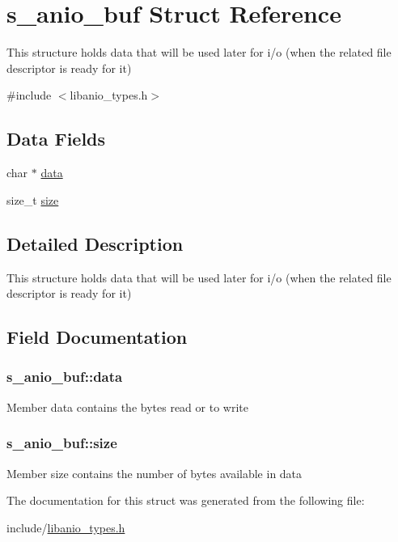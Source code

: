 \hypertarget{structs__anio__buf}{}\section{s\+\_\+anio\+\_\+buf Struct Reference}
\label{structs__anio__buf}


This structure holds data that will be used later for i/o (when the related file descriptor is ready for it)  




{\ttfamily \#include $<$libanio\+\_\+types.\+h$>$}

\subsection*{Data Fields}
\begin{DoxyCompactItemize}
\item 
char $\ast$ \hyperlink{structs__anio__buf_a130032371bea15404f3b665b30a7061b}{data}
\item 
size\+\_\+t \hyperlink{structs__anio__buf_aae7edea53529615402ceec1e26d755cf}{size}
\end{DoxyCompactItemize}


\subsection{Detailed Description}
This structure holds data that will be used later for i/o (when the related file descriptor is ready for it) 

\subsection{Field Documentation}
\hypertarget{structs__anio__buf_a130032371bea15404f3b665b30a7061b}{}
\subsubsection[{data}]{\setlength{\rightskip}{0pt plus 5cm}s\+\_\+anio\+\_\+buf\+::data}\label{structs__anio__buf_a130032371bea15404f3b665b30a7061b}
Member \textquotesingle{}data\textquotesingle{} contains the bytes read or to write \hypertarget{structs__anio__buf_aae7edea53529615402ceec1e26d755cf}{}
\subsubsection[{size}]{\setlength{\rightskip}{0pt plus 5cm}s\+\_\+anio\+\_\+buf\+::size}\label{structs__anio__buf_aae7edea53529615402ceec1e26d755cf}
Member \textquotesingle{}size\textquotesingle{} contains the number of bytes available in data 

The documentation for this struct was generated from the following file\+:\begin{DoxyCompactItemize}
\item 
include/\hyperlink{libanio__types_8h}{libanio\+\_\+types.\+h}\end{DoxyCompactItemize}
